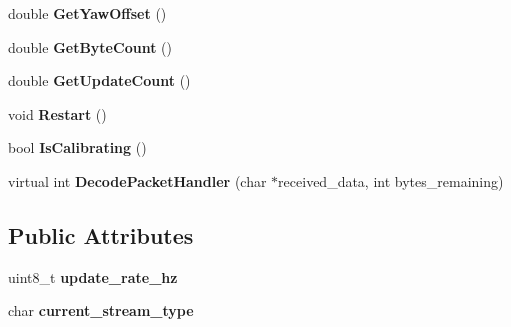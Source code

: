 \begin{DoxyCompactItemize}
\item 
\hypertarget{class_i_m_u_abff8d4585010a9d47ac436a3b88c75a4}{}double {\bfseries Get\+Yaw\+Offset} ()\label{class_i_m_u_abff8d4585010a9d47ac436a3b88c75a4}

\item 
\hypertarget{class_i_m_u_a35cf0cb6759d187a1d436865aeda8720}{}double {\bfseries Get\+Byte\+Count} ()\label{class_i_m_u_a35cf0cb6759d187a1d436865aeda8720}

\item 
\hypertarget{class_i_m_u_aeaa93015313fcc79326bb5e81ab48e00}{}double {\bfseries Get\+Update\+Count} ()\label{class_i_m_u_aeaa93015313fcc79326bb5e81ab48e00}

\item 
\hypertarget{class_i_m_u_acc57c44ede00d36ece51325dcd2f9b1e}{}void {\bfseries Restart} ()\label{class_i_m_u_acc57c44ede00d36ece51325dcd2f9b1e}

\item 
\hypertarget{class_i_m_u_a487c9c4355277cebe1a3b4bcc05b58d1}{}bool {\bfseries Is\+Calibrating} ()\label{class_i_m_u_a487c9c4355277cebe1a3b4bcc05b58d1}

\item 
\hypertarget{class_i_m_u_ab2a470d2fc0193495490bc8e7b36d6cd}{}virtual int {\bfseries Decode\+Packet\+Handler} (char $\ast$received\+\_\+data, int bytes\+\_\+remaining)\label{class_i_m_u_ab2a470d2fc0193495490bc8e7b36d6cd}

\end{DoxyCompactItemize}
\subsection*{Public Attributes}
\begin{DoxyCompactItemize}
\item 
\hypertarget{class_i_m_u_a31e9059f2a805339c1ef3fb210276f2d}{}uint8\+\_\+t {\bfseries update\+\_\+rate\+\_\+hz}\label{class_i_m_u_a31e9059f2a805339c1ef3fb210276f2d}

\item 
\hypertarget{class_i_m_u_af8556bf9f3d975571e340656388bbc6c}{}char {\bfseries current\+\_\+stream\+\_\+type}\label{class_i_m_u_af8556bf9f3d975571e340656388bbc6c}

\end{DoxyCompactItemize}
